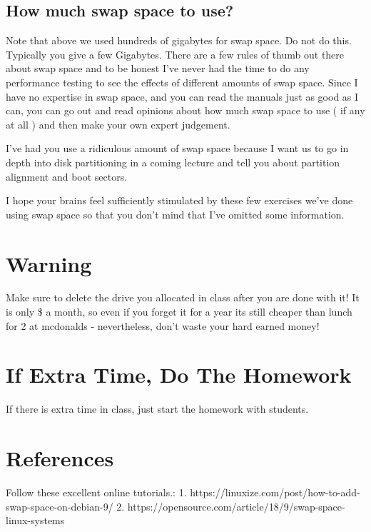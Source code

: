 \documentclass[10pt]{article}
\begin{document}
\subsection{How much swap space to use?} 

Note that above we used hundreds of
gigabytes for swap space. Do not do this. Typically you give a few Gigabytes.
There are a few rules of thumb out there about swap space and to be honest I've
never had the time to do any performance testing to see the effects of different
amounts of swap space. Since I have no expertise in swap space, and you can read
the manuals just as good as I can, you can go out and read opinions about how
much swap space to use ( if any at all ) and then make your own expert
judgement.


I've had you use a ridiculous amount of swap space because I want us to go in
depth into disk partitioning in a coming lecture and tell you about partition
alignment and boot sectors. 

I hope your brains feel sufficiently stimulated by these few exercises we've
done using swap space so that you don't mind that I've omitted some information.

\section{Warning}
Make sure to delete the drive you allocated in class after you are done with it!
It is only \$ a month, so even if you forget it for a year its still cheaper
than lunch for 2 at mcdonalds - nevertheless, don't waste your hard earned
money!

\section{If Extra Time, Do The Homework}
 If there is extra time in class, just
start the homework with students.

\section{References} Follow these excellent online tutorials.: 1.
https://linuxize.com/post/how-to-add-swap-space-on-debian-9/ 2.
https://opensource.com/article/18/9/swap-space-linux-systems
\end{document}
